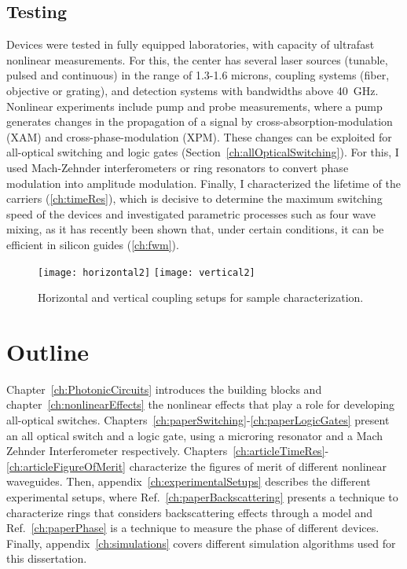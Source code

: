\subsection{Testing}
Devices were tested in fully equipped laboratories, with capacity of ultrafast nonlinear measurements. For this, the center has several laser sources (tunable, pulsed and continuous) in the range of 1.3-1.6 microns, coupling systems (fiber, objective or grating), and detection systems with bandwidths above 40~GHz. Nonlinear experiments include pump and probe measurements, where a pump generates changes in the propagation of a signal by cross-absorption-modulation (XAM) and cross-phase-modulation (XPM). These changes can be exploited for all-optical switching and logic gates (Section~\ref{ch:allOpticalSwitching}). For this, I used Mach-Zehnder interferometers or ring resonators to convert phase modulation into amplitude modulation.
Finally, I characterized the lifetime of the carriers (\ref{ch:timeRes}), which is decisive to determine the maximum switching speed of the devices and investigated parametric processes such as four wave mixing, as it has recently been shown that, under certain conditions, it can be efficient in silicon guides (\ref{ch:fwm}).


\begin{figure}[htb]
  \centering
  \texttt{[image: horizontal2]}            
  \texttt{[image: vertical2]}
  \caption{Horizontal and vertical coupling setups for sample characterization.}
\end{figure}



\section{Outline}
Chapter~\ref{ch:PhotonicCircuits} introduces the building blocks and chapter~\ref{ch:nonlinearEffects} the nonlinear effects that play a role for developing all-optical switches.
Chapters~\ref{ch:paperSwitching}-\ref{ch:paperLogicGates} present an all optical switch and a logic gate, using a microring resonator and a Mach Zehnder Interferometer respectively.
Chapters~\ref{ch:articleTimeRes}-\ref{ch:articleFigureOfMerit} characterize the figures of merit of different nonlinear waveguides.
Then, appendix~\ref{ch:experimentalSetups} describes the different experimental setups, where Ref.~\ref{ch:paperBackscattering} presents a technique to characterize rings that considers backscattering effects through a model and Ref.~\ref{ch:paperPhase} is a technique to measure the phase of different devices. Finally, appendix~\ref{ch:simulations} covers different simulation algorithms used for this dissertation.


\pagestyle{plain}



